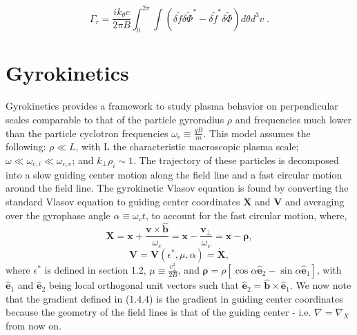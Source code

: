 \documentclass[12pt]{article}
\numberwithin{equation}{subsection}
\begin{document}
   \begin{equation}
      \Gamma_r = \frac{ik_\theta c}{2\pi B}\int_{0}^{2\pi}\int(\delta\widetilde{f}\delta\widetilde{\Phi}^*-\delta\widetilde{f}^*\delta\widetilde{\Phi})d\theta d^{3}v\;.
   \end{equation}


\section{Gyrokinetics}
   \quad Gyrokinetics provides a framework to study plasma behavior on perpendicular scales comparable to that of the
particle gyroradius $\rho$ and frequencies much lower than the particle cyclotron frequencies $\omega_c \equiv \frac{qB}{m}$. This model assumes
the following: $\rho \ll L$, with L the characteristic macroscopic plasma scale; $\omega \ll \omega_{c,i} \ll \omega_{c,e}$;
and $k_\perp \rho_i \sim 1$\cite{GyroKinAstr}. The trajectory of these particles is decomposed into a slow guiding center motion
along the field line and a fast circular motion around the field line. The gyrokinetic Vlasov equation is found by converting the
standard Vlasov equation to guiding center coordinates $\bm{X}$ and $\bm{V}$ and averaging over the gyrophase angle $\alpha
\equiv \omega_c t$, to account for the fast circular motion, where\cite{FriemanChen},
   \begin{equation}
      \bm{X} = \bm{x} + \frac{\bm{v}\times\bm{\hat{b}}}{\omega_c} = \bm{x} - \frac{\bm{v}_\perp}{\omega_c}
             = \bm{x} - \bm{\rho},
   \end{equation}
   \begin{equation}
      \bm{V} = \bm{V}(\epsilon^*, \mu, \alpha) = \dot{\bm{X}},
   \end{equation}
where $\epsilon^*$ is defined in section 1.2, $\mu \equiv \frac{v_\perp^2}{2B}$, and $\bm{\rho} =
\rho[\cos\alpha\bm{\hat{e}}_2 - \sin\alpha\bm{\hat{e}}_1]$, with $\bm{\hat{e}}_1$ and $\bm{\hat{e}}_2$
being local orthogonal unit vectors such that $\bm{\hat{e}}_2=\bm{\hat{b}}\times\bm{\hat{e}}_1$.
We now note that the gradient defined in (1.4.4) is the gradient in guiding center coordinates because
the geometry of the field lines is that of the guiding center - i.e. $\nabla = \nabla_X$ from now on.
\end{document}
